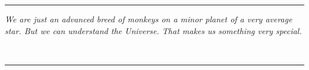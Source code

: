 
\mbox{}
\vspace{.75in}
\hrule

\vspace{2in}


\begin{centering}
	\hspace{.25in} 
	\parbox{5in}{
		\noindent 
		\textit{We are just an advanced breed of monkeys on a minor planet of a very average star. But we can understand the Universe. That makes us something very special.}
		\vspace{3pt}

		\begin{flushright}
			{}\\
		\end{flushright}
	}
\end{centering}
\vspace{2.25in}
\hrule
\vfill


















\textwidth 5.750in \textheight=8.50in \headheight 0.0625in \topmargin 0.0in %
